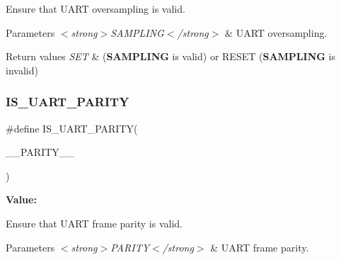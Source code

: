 Ensure that U\+A\+RT oversampling is valid. 


\begin{DoxyParams}{Parameters}
{\em $<$strong$>$\+S\+A\+M\+P\+L\+I\+N\+G$<$/strong$>$} & U\+A\+RT oversampling. \\
\hline
\end{DoxyParams}

\begin{DoxyRetVals}{Return values}
{\em S\+ET} & ({\bfseries{S\+A\+M\+P\+L\+I\+NG}} is valid) or R\+E\+S\+ET ({\bfseries{S\+A\+M\+P\+L\+I\+NG}} is invalid) \\
\hline
\end{DoxyRetVals}
\mbox{\label{group___u_a_r_t___private___macros_ga57b0798bfa43d210f492eb3c5e218a86}} 
\subsubsection{\texorpdfstring{IS\_UART\_PARITY}{IS\_UART\_PARITY}}
{\footnotesize\ttfamily \#define I\+S\+\_\+\+U\+A\+R\+T\+\_\+\+P\+A\+R\+I\+TY(\begin{DoxyParamCaption}\item[{}]{\+\_\+\+\_\+\+P\+A\+R\+I\+T\+Y\+\_\+\+\_\+ }\end{DoxyParamCaption})}

{\bfseries Value\+:}
\begin{DoxyCode}{0}

\end{DoxyCode}


Ensure that U\+A\+RT frame parity is valid. 


\begin{DoxyParams}{Parameters}
{\em $<$strong$>$\+P\+A\+R\+I\+T\+Y$<$/strong$>$} & U\+A\+RT frame parity. \\
\hline
\end{DoxyParams}

